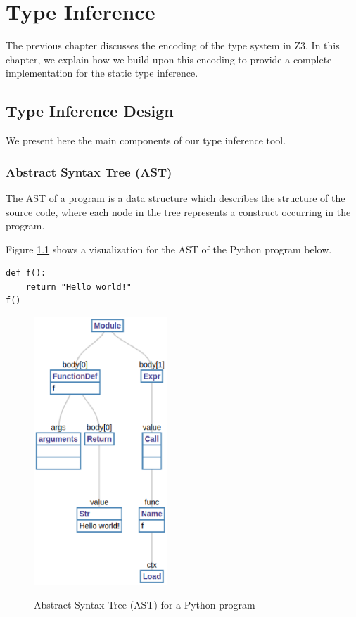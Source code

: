 
\chapter{Type Inference}\label{chapter:ti}
The previous chapter discusses the encoding of the type system in Z3. In this chapter, we explain how we build upon this encoding to provide a complete implementation for the static type inference.

\section{Type Inference Design}
We present here the main components of our type inference tool.
\subsection{Abstract Syntax Tree (AST)}
The AST of a program is a data structure which describes the structure of the source code, where each node in the tree represents a construct occurring in the program.

Figure \ref{fig:ast} shows a visualization for the AST of the Python program below.

\begin{lstlisting}
def f():
	return "Hello world!"
f()
\end{lstlisting}
\begin{figure}
	\begin{mdframed}
		\centering
		\includegraphics[width=50mm]{images/ast.eps}\\
	\end{mdframed}
	\caption{Abstract Syntax Tree (AST) for a Python program}
	\label{fig:ast}
\end{figure}

